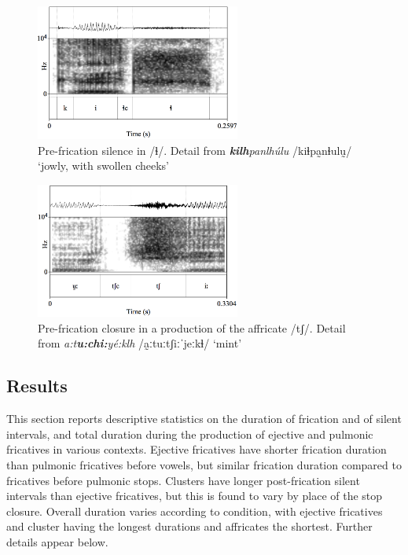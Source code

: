 \documentclass[output=paper,colorlinks,citecolor=brown]{langscibook}
\begin{document}
\begin{figure}
	\includegraphics[width=0.6\textwidth]{figures/kilhpa1nlhU1lu1-HFM}
	\caption[Annotated spectrogram of pre-frication closure]{Pre-frication silence in {/{ɬ}/}. Detail from \textit{\textbf{kilh}pa{\textquotesingle}nlh\'ulu{\textquotesingle}} {/ki{{ɬ}}pa̰n{{ɬ}}ulṵ/} `jowly, with swollen cheeks'}
	\label{fig:closure}
	\end{figure}

\begin{figure}
	\includegraphics[width=0.6\textwidth]{figures/aa1tuu1chiiyEEklh-HFM.png}
	\caption[Annotated spectrogram of a post-alveolar affricate]{Pre-frication closure in a production of the affricate {/tʃ/}. Detail from \textit{a:{\textquotesingle}t\textbf{u:{\textquotesingle}chi:}y\'e:klh} {/a̰ːtuːtʃiːˈjeːk{{ɬ}}/} `mint'}
	\label{fig:release}
\end{figure}


\subsection{Results}\label{section:results}
This section reports descriptive statistics on the duration of frication and of silent intervals, and total duration during the production of ejective and pulmonic fricatives in various contexts. Ejective fricatives have shorter frication duration than pulmonic fricatives before vowels, but similar frication duration compared to fricatives before pulmonic stops. Clusters have longer post-frication silent intervals than ejective fricatives, but this is found to vary by place of the stop closure. Overall duration varies according to condition, with ejective fricatives and cluster having the longest durations and affricates the shortest. Further details appear below.
\end{document}
